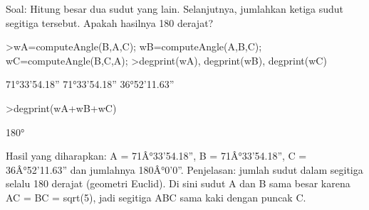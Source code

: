 \documentclass[a4paper,10pt]{article}
\begin{document}
\begin{eulernotebook}
\begin{eulercomment}
\begin{eulercomment}
\begin{eulercomment}
\begin{eulercomment}
\begin{eulercomment}
Soal: Hitung besar dua sudut yang lain. Selanjutnya, jumlahkan ketiga sudut
segitiga tersebut. Apakah hasilnya 180 derajat?
\end{eulercomment}
\begin{eulerprompt}
>wA=computeAngle(B,A,C); wB=computeAngle(A,B,C); wC=computeAngle(B,C,A);
>degprint(wA), degprint(wB), degprint(wC)
\end{eulerprompt}
\begin{euleroutput}
  71°33'54.18''
  71°33'54.18''
  36°52'11.63''
\end{euleroutput}
\begin{eulerprompt}
>degprint(wA+wB+wC)
\end{eulerprompt}
\begin{euleroutput}
  180°
\end{euleroutput}
\begin{eulercomment}
Hasil yang diharapkan: A = 71Â°33'54.18'', B = 71Â°33'54.18'', C = 36Â°52'11.63''
dan jumlahnya 180Â°0'0''.
Penjelasan: jumlah sudut dalam segitiga selalu 180 derajat (geometri Euclid). Di sini sudut A
dan B sama besar karena AC = BC = sqrt(5), jadi segitiga ABC sama kaki dengan puncak C.


\end{eulercomment}
\end{eulercomment}
\end{eulercomment}
\end{eulercomment}
\end{eulercomment}
\end{eulernotebook}
\end{document}
